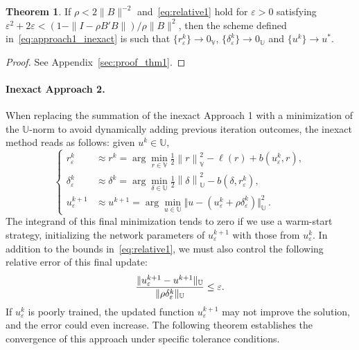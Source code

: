 \documentclass{article}
\theoremstyle{definition}
\newtheorem{theorem}{Theorem}
\begin{document}
\begin{theorem}\label{thm:approach1_inexact}
    If $\rho<2\|B\|^{-2}$ and~\eqref{eq:relative1} hold for $\varepsilon>0$ satisfying $\varepsilon^2+2\varepsilon< (1-\|I-\rho B'B\|)/\rho \|B\|^2$, then the scheme defined in~\eqref{eq:approach1_inexact} is such that $\{r^k_\varepsilon\}\to 0_\mathbb{V}$, 
    $\{\delta^k_\varepsilon\}\to 0_\mathbb{U}$ and $\{u^k\}\to u^*$.
\end{theorem}
\begin{proof}
     See Appendix~\ref{sec:proof_thm1}. 
\end{proof} 

\paragraph{Inexact Approach 2.}
When replacing the summation of  the inexact Approach 1 with a minimization of the $\mathbb{U}$-norm to avoid dynamically adding previous iteration outcomes, the inexact method reads as follows: given $u^k\in\mathbb U$,
\begin{equation}\label{eq:approach2_inexact}
    \left\{
    \begin{aligned}
        r^k_\varepsilon&\approx r^{k} =  \displaystyle \arg\min_{r\in \mathbb{V}}\frac{1}{2}\left\|r\right\|^2_{\mathbb{V}} - \ell(r)  + b(u^k_\varepsilon,r), \\[2ex]
        \delta^k_{\varepsilon}&\approx\delta^{k} =  \displaystyle\arg\min_{\delta\in \mathbb{U}}\frac{1}{2}\left\|\delta\right\|^2_{\mathbb{U}} - b(\delta,r^{k}_\varepsilon),\\[2ex]
        u^{k+1}_\varepsilon&\approx    u^{k+1} = \displaystyle\arg\min_{u\in\mathbb{U}} \Vert u - (u^k_\varepsilon + \rho \delta^k_\varepsilon)\Vert_{\mathbb{U}}^2\,.
    \end{aligned}
    \right.
\end{equation} 
The integrand of this final minimization tends to zero if we use a warm-start strategy, initializing the network parameters of $u^{k+1}_\varepsilon$ with those from $u^k_\varepsilon$. In addition to the bounds in~\eqref{eq:relative1}, we must also control the following relative error of this final update:
\begin{equation}\label{eq:u_relative_err}
{\|u^{k+1}_\varepsilon-u^{k+1}\|_\mathbb{U}\over \|\rho\delta_\varepsilon^k\|_\mathbb{U}}\leq \varepsilon.
\end{equation}
If $u^k_\varepsilon$ is poorly trained, the updated function $u^{k+1}_\varepsilon$ may not improve the solution, and the error could even increase. The following theorem establishes the convergence of this approach under specific tolerance conditions.
\end{document}
